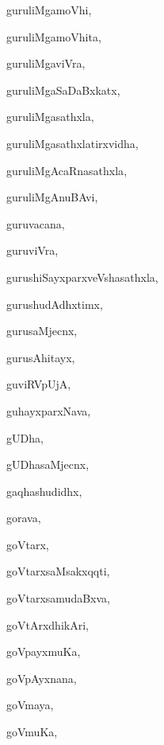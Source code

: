 \begin{multicols}{3}
{\noindent
{guruliMgamoVhi}, \pageref{guruliMgamoVhi}

\noindent
{guruliMgamoVhita}, \pageref{guruliMgamoVhita}

\noindent
{guruliMgaviVra}, \pageref{guruliMgaviVra}

\noindent
{guruliMgaSaDaBxkatx}, \pageref{guruliMgaSaDaBxkatx}

\noindent
{guruliMgasathxla}, \pageref{guruliMgasathxla}

\noindent
{guruliMgasathxlatirxvidha}, \pageref{guruliMgasathxlatirxvidha}

\noindent
{guruliMgAcaRnasathxla}, \pageref{guruliMgAcaRnasathxla}

\noindent
{guruliMgAnuBAvi}, \pageref{guruliMgAnuBAvi}

\noindent
{guruvacana}, \pageref{guruvacana}

\noindent
{guruviVra}, \pageref{guruviVra}

\noindent
{gurushiSayxparxveVshasathxla}, \pageref{gurushiSayxparxveVshasathxla}

\noindent
{gurushudAdhxtimx}, \pageref{gurushudAdhxtimx}

\noindent
{gurusaMjecnx}, \pageref{gurusaMjecnx}

\noindent
{gurusAhitayx}, \pageref{gurusAhitayx}

\noindent
{guviRVpUjA}, \pageref{guviRVpUjA}

\noindent
{guhayxparxNava}, \pageref{guhayxparxNava}

\noindent
{gUDha}, \pageref{gUDha}

\noindent
{gUDhasaMjecnx}, \pageref{gUDhasaMjecnx}

\noindent
{gaqhashudidhx}, \pageref{gaqhashudidhx}

\noindent
{gorava}, \pageref{gorava}

\noindent
{goVtarx}, \pageref{goVtarx}

\noindent
{goVtarxsaMsakxqqti}, \pageref{goVtarxsaMsakxqqti}

\noindent
{goVtarxsamudaBxva}, \pageref{goVtarxsamudaBxva}

\noindent
{goVtArxdhikAri}, \pageref{goVtArxdhikAri}

\noindent
{goVpayxmuKa}, \pageref{goVpayxmuKa}

\noindent
{goVpAyxnana}, \pageref{goVpAyxnana}

\noindent
{goVmaya}, \pageref{goVmaya}

\noindent
{goVmuKa}, \pageref{goVmuKa}

}
\end{multicols}

